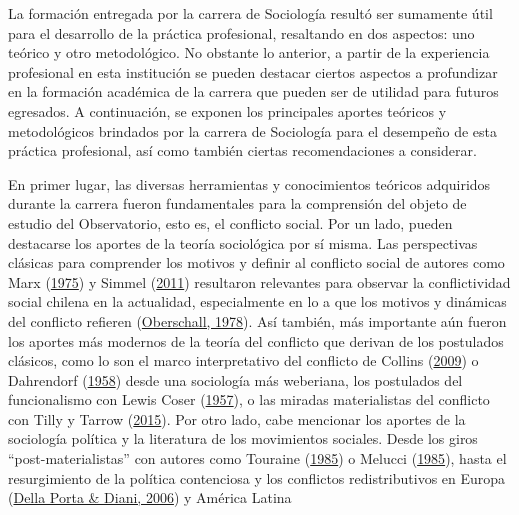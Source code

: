 \documentclass[
  12pt,
]{article}
\begin{document}
\doublespacing

La formación entregada por la carrera de Sociología resultó ser
sumamente útil para el desarrollo de la práctica profesional, resaltando
en dos aspectos: uno teórico y otro metodológico. No obstante lo
anterior, a partir de la experiencia profesional en esta institución se
pueden destacar ciertos aspectos a profundizar en la formación académica
de la carrera que pueden ser de utilidad para futuros egresados. A
continuación, se exponen los principales aportes teóricos y
metodológicos brindados por la carrera de Sociología para el desempeño
de esta práctica profesional, así como también ciertas recomendaciones a
considerar.

En primer lugar, las diversas herramientas y conocimientos teóricos
adquiridos durante la carrera fueron fundamentales para la comprensión
del objeto de estudio del Observatorio, esto es, el conflicto social.
Por un lado, pueden destacarse los aportes de la teoría sociológica por
sí misma. Las perspectivas clásicas para comprender los motivos y
definir al conflicto social de autores como Marx
(\protect\hyperlink{ref-marxCapital1975}{1975}) y Simmel
(\protect\hyperlink{ref-simmelGeorgSimmelIndividuality2011}{2011})
resultaron relevantes para observar la conflictividad social chilena en
la actualidad, especialmente en lo a que los motivos y dinámicas del
conflicto refieren
(\protect\hyperlink{ref-oberschallTheoriesSocialConflict1978}{Oberschall,
1978}). Así también, más importante aún fueron los aportes más modernos
de la teoría del conflicto que derivan de los postulados clásicos, como
lo son el marco interpretativo del conflicto de Collins
(\protect\hyperlink{ref-collinsConflictSociologySociological2009a}{2009})
o Dahrendorf
(\protect\hyperlink{ref-dahrendorfTheorySocialConflict1958a}{1958})
desde una sociología más weberiana, los postulados del funcionalismo con
Lewis Coser
(\protect\hyperlink{ref-coserSocialConflictTheory1957a}{1957}), o las
miradas materialistas del conflicto con Tilly y Tarrow
(\protect\hyperlink{ref-tillyContentiousPolitics2015a}{2015}). Por otro
lado, cabe mencionar los aportes de la sociología política y la
literatura de los movimientos sociales. Desde los giros
``post-materialistas'' con autores como Touraine
(\protect\hyperlink{ref-touraineIntroductionStudySocial1985}{1985}) o
Melucci
(\protect\hyperlink{ref-melucciSymbolicChallengeContemporary1985}{1985}),
hasta el resurgimiento de la política contenciosa y los conflictos
redistributivos en Europa
(\protect\hyperlink{ref-dellaportaSocialMovementsIntroduction2006}{Della
Porta \& Diani, 2006}) y América Latina
\end{document}

